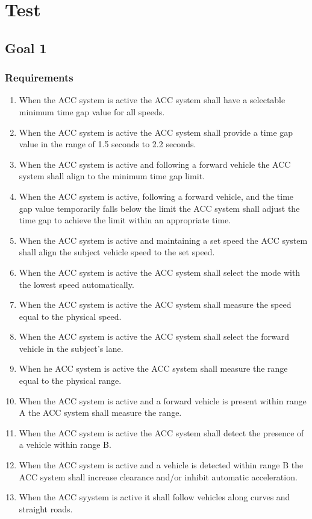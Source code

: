 
\section{Test}


\subsection{Goal 1}

\subsubsection{Requirements} \label{goal_1_requirements}
\begin{enumerate}
    \item When the ACC system is active the ACC system shall have a selectable minimum time gap value for all speeds.
    \item When the ACC system is active the ACC system shall provide a time gap value in the range of 1.5 seconds to 2.2 seconds.
    \item When the ACC system is active and following a forward vehicle the ACC system shall align to the minimum time gap limit.
    \item When the ACC system is active, following a forward vehicle, and the time gap value temporarily falls below the limit the ACC system shall adjust the time gap to achieve the limit within an appropriate time.
    \item When the ACC system is active and maintaining a set speed the ACC system shall align the subject vehicle speed to the set speed.
    \item When the ACC system is active the ACC system shall select the mode with the lowest speed automatically.
    \item When the ACC system is active the ACC system shall measure the speed equal to the physical speed. 
    \item When the ACC system is active the ACC system shall select the forward vehicle in the subject’s lane.
    \item When he ACC system is active the ACC system shall measure the range equal to the physical range.
    \item When the ACC system is active and a forward vehicle is present within range A the ACC system shall measure the range.
    \item When the ACC system is active the ACC system shall detect the presence of a vehicle within range B.
    \item When the ACC system is active and a vehicle is detected within range B the ACC system shall increase clearance and/or inhibit automatic acceleration.
    \item When the ACC syystem is active it shall follow vehicles along curves and straight roads.
\end{enumerate}

